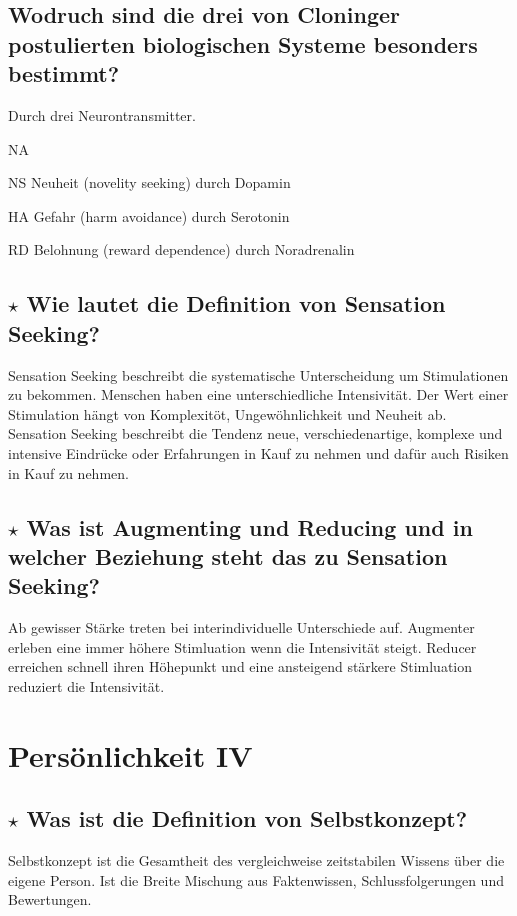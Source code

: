 \documentclass[a4paper,9pt,DIV=14]{scrartcl}
\begin{document}
\subsection{Wodruch sind die drei von Cloninger postulierten biologischen Systeme besonders bestimmt?}
Durch drei Neurontransmitter.
    \begin{labeling}{NA}
    \item [NS] Neuheit (novelity seeking) durch Dopamin
    \item [HA] Gefahr (harm avoidance) durch Serotonin
    \item [RD] Belohnung (reward dependence) durch Noradrenalin
    \end{labeling}
\subsection{$\star$ Wie lautet die Definition von Sensation Seeking?} %
    Sensation Seeking beschreibt die systematische Unterscheidung um Stimulationen zu bekommen. Menschen haben eine unterschiedliche Intensivität. Der Wert einer Stimulation hängt von Komplexitöt, Ungewöhnlichkeit und Neuheit ab.\\
    Sensation Seeking beschreibt die Tendenz neue, verschiedenartige, komplexe und intensive Eindrücke oder Erfahrungen in Kauf zu nehmen und dafür auch Risiken in Kauf zu nehmen.
\subsection{$\star$ Was ist Augmenting und Reducing und in welcher Beziehung steht das zu Sensation Seeking?} %
    Ab gewisser Stärke treten bei interindividuelle Unterschiede auf. Augmenter erleben eine immer höhere Stimluation wenn die Intensivität steigt. Reducer erreichen schnell ihren Höhepunkt und eine ansteigend stärkere Stimluation reduziert die Intensivität.

\section{Persönlichkeit IV}
\subsection{$\star$ Was ist die Definition von Selbstkonzept?} %
Selbstkonzept ist die Gesamtheit des vergleichweise zeitstabilen Wissens über die eigene Person. Ist die Breite Mischung aus Faktenwissen, Schlussfolgerungen und Bewertungen.
\end{document}
